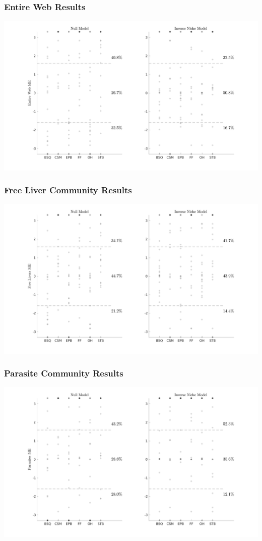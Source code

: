 \documentclass[table]{beamer}
\begin{document}
\begin{frame}
    \frametitle{Entire Web Results}
    \includegraphics[width=\textwidth]{figures/INM-Props1.png}
\end{frame}

\begin{frame}
    \frametitle{Free Liver Community Results}
    \includegraphics[width=\textwidth]{figures/INM-Props2.png}
\end{frame}

\begin{frame}
    \frametitle{Parasite Community Results}
    \includegraphics[width=\textwidth]{figures/INM-Props3.png}
\end{frame}
\end{document}
